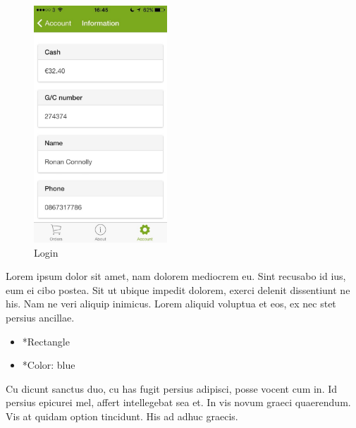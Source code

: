\begin{minipage}{5cm}
	\begin{figure}[H]
		\includegraphics[width=5cm]{img/mobile-app/screen-shots/IMG_2917.jpg}
		\caption{Login}
	\end{figure}
\end{minipage} \hfill
\begin{minipage}{0.55\textwidth}
	Lorem ipsum dolor sit amet, nam dolorem mediocrem eu. Sint recusabo id ius, eum ei cibo postea. Sit ut ubique impedit dolorem, exerci delenit dissentiunt ne his. Nam ne veri aliquip inimicus. Lorem aliquid voluptua et eos, ex nec stet persius ancillae.
	\begin{itemize}
		\item *Rectangle
		\item *Color: blue
	\end{itemize}
	Cu dicunt sanctus duo, cu has fugit persius adipisci, posse vocent cum in. Id persius epicurei mel, affert intellegebat sea et. In vis novum graeci quaerendum. Vis at quidam option tincidunt. His ad adhuc graecis.
\end{minipage}

